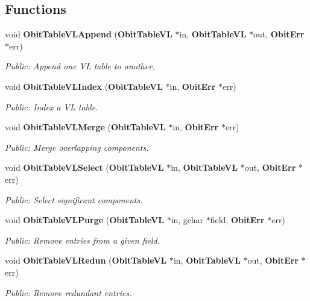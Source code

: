 \subsection*{Functions}
\begin{CompactItemize}
\item 
void {\bf Obit\-Table\-VLAppend} ({\bf Obit\-Table\-VL} $\ast$in, {\bf Obit\-Table\-VL} $\ast$out, {\bf Obit\-Err} $\ast$err)
\begin{CompactList}\small\item\em Public: Append one VL table to another. \item\end{CompactList}\item 
void {\bf Obit\-Table\-VLIndex} ({\bf Obit\-Table\-VL} $\ast$in, {\bf Obit\-Err} $\ast$err)
\begin{CompactList}\small\item\em Public: Index a VL table. \item\end{CompactList}\item 
void {\bf Obit\-Table\-VLMerge} ({\bf Obit\-Table\-VL} $\ast$in, {\bf Obit\-Err} $\ast$err)
\begin{CompactList}\small\item\em Public: Merge overlapping components. \item\end{CompactList}\item 
void {\bf Obit\-Table\-VLSelect} ({\bf Obit\-Table\-VL} $\ast$in, {\bf Obit\-Table\-VL} $\ast$out, {\bf Obit\-Err} $\ast$err)
\begin{CompactList}\small\item\em Public: Select significant components. \item\end{CompactList}\item 
void {\bf Obit\-Table\-VLPurge} ({\bf Obit\-Table\-VL} $\ast$in, gchar $\ast$field, {\bf Obit\-Err} $\ast$err)
\begin{CompactList}\small\item\em Public: Remove entries from a given field. \item\end{CompactList}\item 
void {\bf Obit\-Table\-VLRedun} ({\bf Obit\-Table\-VL} $\ast$in, {\bf Obit\-Table\-VL} $\ast$out, {\bf Obit\-Err} $\ast$err)
\begin{CompactList}\small\item\em Public: Remove redundant entries. \item\end{CompactList}\item 

\end{CompactItemize}
